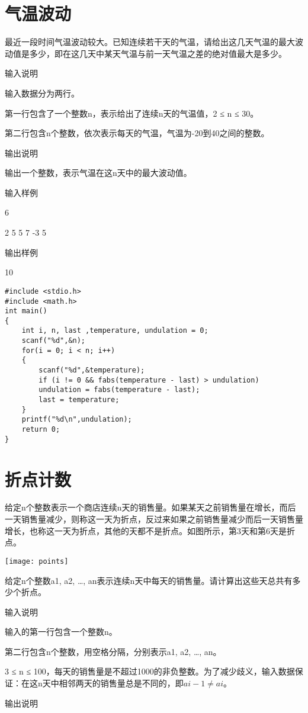 \section{气温波动}	
最近一段时间气温波动较大。已知连续若干天的气温，请给出这几天气温的最大波动值是多少，即在这几天中某天气温与前一天气温之差的绝对值最大是多少。

输入说明	

输入数据分为两行。

第一行包含了一个整数n，表示给出了连续n天的气温值，2 ≤ n ≤ 30。

第二行包含n个整数，依次表示每天的气温，气温为-20到40之间的整数。

输出说明
	
输出一个整数，表示气温在这n天中的最大波动值。

输入样例	

6

2 5 5 7 -3 5

输出样例
	
10

\begin{lstlisting}
#include <stdio.h>
#include <math.h>
int main()
{
	int i, n, last ,temperature, undulation = 0;
	scanf("%d",&n);
	for(i = 0; i < n; i++)
	{
		scanf("%d",&temperature);
		if (i != 0 && fabs(temperature - last) > undulation) 
		undulation = fabs(temperature - last);
		last = temperature;
	} 
	printf("%d\n",undulation); 
	return 0;
} 
\end{lstlisting}

\section{折点计数}	
给定n个整数表示一个商店连续n天的销售量。如果某天之前销售量在增长，而后一天销售量减少，则称这一天为折点，反过来如果之前销售量减少而后一天销售量增长，也称这一天为折点，其他的天都不是折点。如图所示，第3天和第6天是折点。

\texttt{[image: points]}

给定n个整数a1, a2, \dots, an表示连续n天中每天的销售量。请计算出这些天总共有多少个折点。

输入说明
	
输入的第一行包含一个整数n。

第二行包含n个整数，用空格分隔，分别表示a1, a2, \dots, an。

3 ≤ n ≤ 100，每天的销售量是不超过1000的非负整数。为了减少歧义，输入数据保证：在这n天中相邻两天的销售量总是不同的，即$ai-1\ne ai$。

输出说明	


